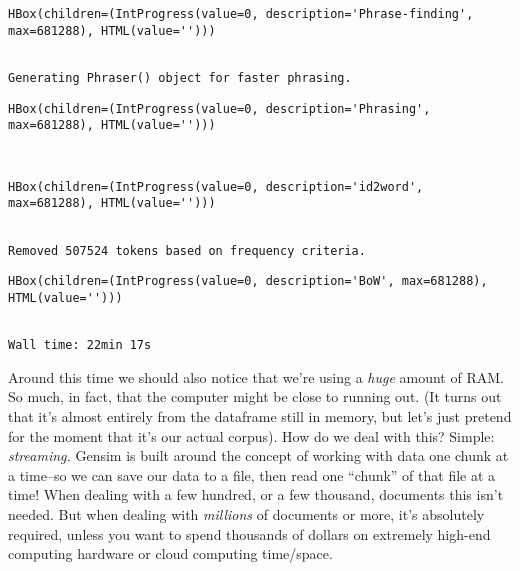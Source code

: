 \documentclass[11pt]{article}
\begin{document}
    
    \begin{verbatim}
HBox(children=(IntProgress(value=0, description='Phrase-finding', max=681288), HTML(value='')))
    \end{verbatim}

    
    \begin{Verbatim}[commandchars=\\\{\}]

Generating Phraser() object for faster phrasing.

    \end{Verbatim}

    
    \begin{verbatim}
HBox(children=(IntProgress(value=0, description='Phrasing', max=681288), HTML(value='')))
    \end{verbatim}

    
    \begin{Verbatim}[commandchars=\\\{\}]


    \end{Verbatim}

    
    \begin{verbatim}
HBox(children=(IntProgress(value=0, description='id2word', max=681288), HTML(value='')))
    \end{verbatim}

    
    \begin{Verbatim}[commandchars=\\\{\}]

Removed 507524 tokens based on frequency criteria.

    \end{Verbatim}

    
    \begin{verbatim}
HBox(children=(IntProgress(value=0, description='BoW', max=681288), HTML(value='')))
    \end{verbatim}

    
    \begin{Verbatim}[commandchars=\\\{\}]

Wall time: 22min 17s

    \end{Verbatim}

    Around this time we should also notice that we're using a \emph{huge}
amount of RAM. So much, in fact, that the computer might be close to
running out. (It turns out that it's almost entirely from the dataframe
still in memory, but let's just pretend for the moment that it's our
actual corpus). How do we deal with this? Simple: \emph{streaming.}
Gensim is built around the concept of working with data one chunk at a
time--so we can save our data to a file, then read one ``chunk'' of that
file at a time! When dealing with a few hundred, or a few thousand,
documents this isn't needed. But when dealing with \emph{millions} of
documents or more, it's absolutely required, unless you want to spend
thousands of dollars on extremely high-end computing hardware or cloud
computing time/space.
\end{document}
